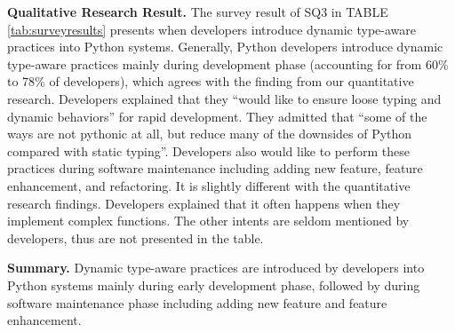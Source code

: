 \textbf{Qualitative Research Result.}
The survey result of SQ3 in TABLE \ref{tab:surveyresults} presents when developers introduce dynamic type-aware practices into Python systems. Generally, Python developers introduce dynamic type-aware practices mainly during development phase (accounting for from 60\% to 78\% of developers), which agrees with the finding from our quantitative research. Developers explained that they ``would like to ensure loose typing and dynamic behaviors'' for rapid development. They admitted that ``some of the ways are not pythonic at all, but reduce many of the downsides of Python compared with static typing''. Developers also would like to perform these practices during software maintenance including adding new feature, feature enhancement, and refactoring. It is slightly different with the quantitative research findings. Developers explained that it often happens when they implement complex functions. The other intents are seldom mentioned by developers, thus are not presented in the table.


\textbf{Summary.} 
Dynamic type-aware practices are introduced by developers into Python systems mainly during early development phase, followed by during software maintenance phase including adding new feature and feature enhancement.




